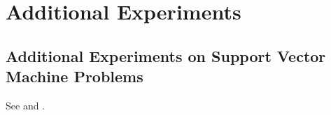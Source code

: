 \section{Additional Experiments} \label{app:additional}


%
%
%
%

\subsection{Additional Experiments on Support Vector Machine Problems}
See  and .

